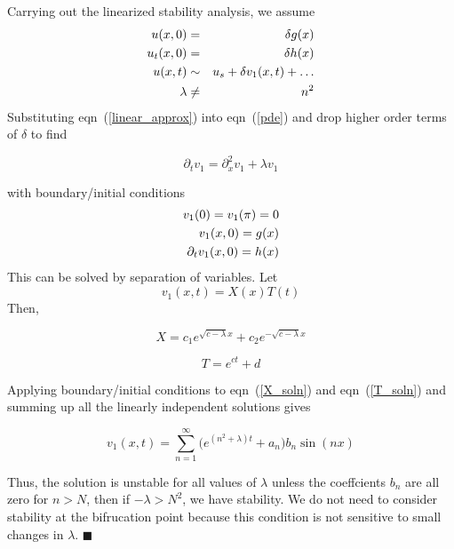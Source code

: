\documentclass[11pt]{article}
\newcommand{\eqn}[2]{
  \begin{equation}
    \label{#1}
    #2
  \end{equation}
}
\newcommand{\lam}{\lambda}
\newcommand{\eqr}[1]{eqn~(\ref{#1})}
\newcommand{\p}[1]{\partial_{#1}}
\begin{document}
\begin{description}
Carrying out the linearized stability analysis, we assume
\begin{eqnarray}
  u(x,0) &=& \delta g(x) \notag \\
  u_t(x,0) &=& \delta h(x) \notag \\
  u(x,t) &\sim& u_s + \delta v_1(x, t) + \ldots \label{linear_approx}\\
  \lambda &\neq& n^2 \notag
\end{eqnarray}
Substituting \eqr{linear_approx} into \eqr{pde} and drop higher order terms of $\delta$ to find
\eqn{v1_eqn}{
  \p{t}v_1
  =
  \p{x}^2 v_1 + \lambda v_1
}
with boundary/initial conditions
\begin{eqnarray}
  v_1(0) = v_1(\pi) = 0 \notag \\
  v_1(x,0) = g(x) \notag \\
  \p{t} v_1(x,0) = h(x) \notag
\end{eqnarray}
This can be solved by separation of variables. Let
$$
 v_1(x,t) = X(x)T(t)
$$
Then,
\eqn{X_soln}{
  X =
  c_1 e^{\sqrt{c - \lambda} x}
  + c_2 e^{-\sqrt{c - \lambda} x}
}
\eqn{T_soln}{
  T = e^{ct} + d
}
Applying boundary/initial conditions to \eqr{X_soln} and \eqr{T_soln}
and summing up all the linearly independent solutions gives
\eqn{v1_soln}{
  v_1(x,t) = \sum_{n=1}^\infty
  \bigg(
    e^{(n^2 + \lambda) t} + a_n
  \bigg)
  b_n \sin(nx)
}
Thus, the solution is unstable for all values of $\lambda$ unless the coeffcients
$b_n$ are all zero for $n > N$, then if $-\lam > N^2$, we have stability. We do not
need to consider stability at the bifrucation point because this condition is not
sensitive to small changes in $\lam$.
\hfill $\blacksquare$
\end{description}
\end{document}
